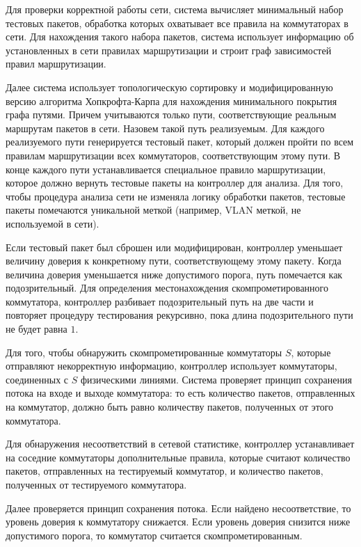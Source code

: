 \documentclass[../thesis.tex]{subfiles}
\begin{document}
Для проверки корректной работы сети, система вычисляет минимальный набор тестовых пакетов, обработка которых охватывает все правила на коммутаторах в сети.
Для нахождения такого набора пакетов, система использует информацию об установленных в сети правилах маршрутизации и строит граф зависимостей правил маршрутизации.

Далее система использует топологическую сортировку \cite{dilworth1950decomposition} и модифицированную версию алгоритма Хопкрофта-Карпа \cite{hopcroft1973n} для нахождения минимального покрытия графа путями.
Причем учитываются только пути, соответствующие реальным маршрутам пакетов в сети.
Назовем такой путь реализуемым.
Для каждого реализуемого пути генерируется тестовый пакет, который должен пройти по всем правилам маршрутизации всех коммутаторов, соответствующим этому пути.
В конце каждого пути устанавливается специальное правило маршрутизации, которое должно вернуть тестовые пакеты на контроллер для анализа. 
Для того, чтобы процедура анализа сети не изменяла логику обработки пакетов, тестовые пакеты помечаются уникальной меткой (например, VLAN меткой, не используемой в сети).

Если тестовый пакет был сброшен или модифицирован, контроллер уменьшает величину доверия к конкретному пути, соответствующему этому пакету.
Когда величина доверия уменьшается ниже допустимого порога, путь помечается как подозрительный.
Для определения местонахождения скомпрометированного коммутатора, контроллер разбивает подозрительный путь на две части и повторяет процедуру тестирования рекурсивно, пока длина подозрительного пути не будет равна $1$.

Для того, чтобы обнаружить скомпрометированные коммутаторы $S$, которые отправляют некорректную информацию, контроллер использует коммутаторы, соединенных с $S$ физическими линиями.
Система проверяет принцип сохранения потока на входе и выходе коммутатора: то есть количество пакетов, отправленных на коммутатор, должно быть равно количеству пакетов, полученных от этого коммутатора.

Для обнаружения несоответствий в сетевой статистике, контроллер устанавливает на соседние коммутаторы дополнительные правила, которые считают количество пакетов, отправленных на тестируемый коммутатор, и количество пакетов, полученных от тестируемого коммутатора.

Далее проверяется принцип сохранения потока.
Если найдено несоответствие, то уровень доверия к коммутатору снижается.
Если уровень доверия снизится ниже допустимого порога, то коммутатор считается скомпрометированным.
\\
\end{document}
